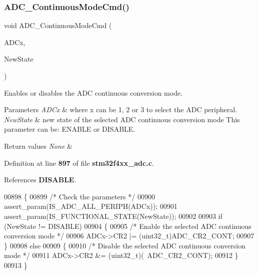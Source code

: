 \subsubsection{A\+D\+C\+\_\+\+Continuous\+Mode\+Cmd()}
{\footnotesize\ttfamily void A\+D\+C\+\_\+\+Continuous\+Mode\+Cmd (\begin{DoxyParamCaption}\item[{\textbf{ A\+D\+C\+\_\+\+Type\+Def} $\ast$}]{A\+D\+Cx,  }\item[{\textbf{ Functional\+State}}]{New\+State }\end{DoxyParamCaption})}



Enables or disables the A\+DC continuous conversion mode. 


\begin{DoxyParams}{Parameters}
{\em A\+D\+Cx} & where x can be 1, 2 or 3 to select the A\+DC peripheral. \\
\hline
{\em New\+State} & new state of the selected A\+DC continuous conversion mode This parameter can be\+: E\+N\+A\+B\+LE or D\+I\+S\+A\+B\+LE. \\
\hline
\end{DoxyParams}

\begin{DoxyRetVals}{Return values}
{\em None} & \\
\hline
\end{DoxyRetVals}


Definition at line \textbf{ 897} of file \textbf{ stm32f4xx\+\_\+adc.\+c}.



References \textbf{ D\+I\+S\+A\+B\+LE}.


\begin{DoxyCode}
00898 \{
00899   \textcolor{comment}{/* Check the parameters */}
00900   assert_param(IS_ADC_ALL_PERIPH(ADCx));
00901   assert_param(IS_FUNCTIONAL_STATE(NewState));
00902   
00903   \textcolor{keywordflow}{if} (NewState != DISABLE)
00904   \{
00905     \textcolor{comment}{/* Enable the selected ADC continuous conversion mode */}
00906     ADCx->CR2 |= (uint32\_t)ADC_CR2_CONT;
00907   \}
00908   \textcolor{keywordflow}{else}
00909   \{
00910     \textcolor{comment}{/* Disable the selected ADC continuous conversion mode */}
00911     ADCx->CR2 &= (uint32\_t)(~ADC_CR2_CONT);
00912   \}
00913 \}
\end{DoxyCode}
\mbox{\label{group__ADC__Group4_ga6eb241ba82d67d1371136c9132083937}} 
